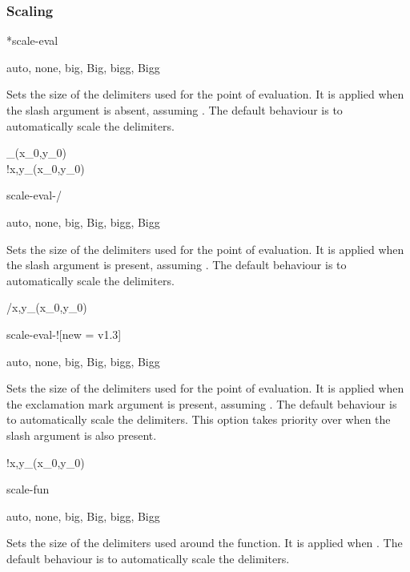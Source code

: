 \subsubsection*{Scaling}

\begin{option}*{scale-eval}
	\begin{values}[default = auto]
		auto, none, big, Big, bigg, Bigg
	\end{values}
	Sets the size of the delimiters used for the point of evaluation. It is applied when the slash argument is absent, assuming . The default behaviour is to automatically scale the delimiters.
	\begin{example}
		_{(x_0,y_0)}\\
		!{x,y}_{(x_0,y_0)}
	\end{example}
\end{option}

\begin{option}{scale-eval-/}
	\begin{values}[default = auto]
		auto, none, big, Big, bigg, Bigg
	\end{values}
	Sets the size of the delimiters used for the point of evaluation. It is applied when the slash argument is present, assuming . The default behaviour is to automatically scale the delimiters.
	\begin{example}
		/{x,y}_{(x_0,y_0)}
	\end{example}
\end{option}

\begin{option}{scale-eval-!}[new = v1.3]
	\begin{values}[default = auto]
		auto, none, big, Big, bigg, Bigg
	\end{values}
	Sets the size of the delimiters used for the point of evaluation. It is applied when the exclamation mark argument is present, assuming . The default behaviour is to automatically scale the delimiters. This option takes priority over  when the slash argument is also present.
	\begin{example}
		!{x,y}_{(x_0,y_0)}
	\end{example}
\end{option}

\begin{option}{scale-fun}
	\begin{values}[default = auto]
		auto, none, big, Big, bigg, Bigg
	\end{values}
	Sets the size of the delimiters used around the function. It is applied when . The default behaviour is to automatically scale the delimiters.
	\begin{example}
		\pdv[scale-fun=big, fun]{f}{x,y}
	\end{example}
\end{option}

